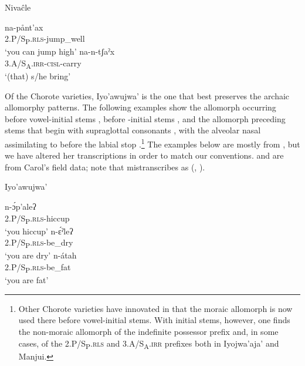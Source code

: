 \ea\label{ex:sylln:2:niv}
    Nivaĉle \citep[255, 527]{LC20}
    \begin{xlist}
        \ex\gll na-pånt'ax\\
                2.P/S\textsubscript{P}.{\textsc{rls}}-jump\_well\\
                \glt `you can jump high'
        \ex\gll na-n-tʃaˀx\\
                3.A/S\textsubscript{A}.{\textsc{irr-cisl}}-carry\\
                \glt `(that) s/he bring'
    \end{xlist}
\z

Of the Chorote varieties, Iyo'awujwa' is the one that best preserves the archaic allomorphy patterns. The following examples show the allomorph  occurring before vowel\mbox{-}initial stems ,  before \mbox{-}initial stems , and the allomorph  preceding stems that begin with supraglottal consonants , with the alveolar nasal assimilating to  before the labial stop .\footnote{Other Chorote varieties have innovated in that the moraic allomorph  is now used there before vowel-initial stems. With initial stems, however, one finds the non-moraic allomorph of the indefinite possessor prefix and, in some cases, of the 2.P/S\textsubscript{P}.{\textsc{rls}} and 3.A/S\textsubscript{A}.{\textsc{irr}} prefixes both in Iyojwa'aja' and Manjui.} The examples below are mostly from \citet{AG83}, but we have altered her transcriptions in order to match our conventions.  and  are from Carol’s field data; note that \citet[77]{AG83} mistranscribes  as  (, ).

\ea\label{ex:sylln:1:i'w}
    Iyo'awujwa' \citep[77]{AG83}
    \begin{xlist}
        \ex\gll n-ɔ́p'aleʔ\label{i'w-youhiccup}\\
                2.P/S\textsubscript{P}.{\textsc{rls}}-hiccup\\
                \glt `you hiccup'
        \ex\gll n-ɛ́ˀleʔ\\
                2.P/S\textsubscript{P}.{\textsc{rls}}-be\_dry\\
                \glt `you are dry'
        \ex\gll n-átah\\
                2.P/S\textsubscript{P}.{\textsc{rls}}-be\_fat\\
                \glt `you are fat'
    \end{xlist}
\z


